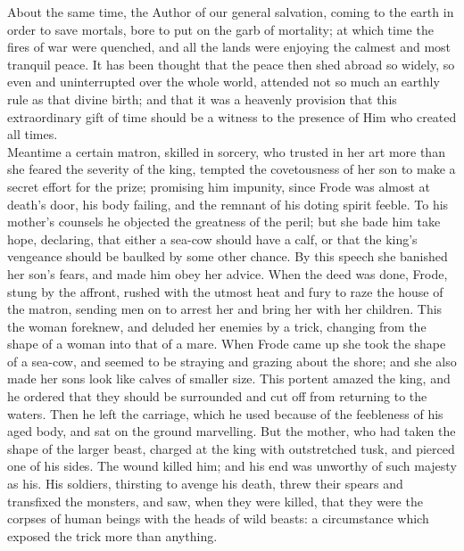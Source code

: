 \documentclass[10pt,a4paper]{report}
\begin{document}
About the same time, the Author of our general salvation, coming to the earth in order to save mortals, bore to put on the garb of mortality; at which time the fires of war were quenched, and all the lands were enjoying the calmest and most tranquil peace. It has been thought that the peace then shed abroad so widely, so even and uninterrupted over the whole world, attended not so much an earthly rule as that divine birth; and that it was a heavenly provision that this extraordinary gift of time should be a witness to the presence of Him who created all times.\\

Meantime a certain matron, skilled in sorcery, who trusted in her art more than she feared the severity of the king, tempted the covetousness of her son to make a secret effort for the prize; promising him impunity, since Frode was almost at death's door, his body failing, and the remnant of his doting spirit feeble. To his mother's counsels he objected the greatness of the peril; but she bade him take hope, declaring, that either a sea-cow should have a calf, or that the king's vengeance should be baulked by some other chance. By this speech she banished her son's fears, and made him obey her advice. When the deed was done, Frode, stung by the affront, rushed with the utmost heat and fury to raze the house of the matron, sending men on to arrest her and bring her with her children. This the woman foreknew, and deluded her enemies by a trick, changing from the shape of a woman into that of a mare. When Frode came up she took the shape of a sea-cow, and seemed to be straying and grazing about the shore; and she also made her sons look like calves of smaller size. This portent amazed the king, and he ordered that they should be surrounded and cut off from returning to the waters. Then he left the carriage, which he used because of the feebleness of his aged body, and sat on the ground marvelling. But the mother, who had taken the shape of the larger beast, charged at the king with outstretched tusk, and pierced one of his sides. The wound killed him; and his end was unworthy of such majesty as his. His soldiers, thirsting to avenge his death, threw their spears and transfixed the monsters, and saw, when they were killed, that they were the corpses of human beings with the heads of wild beasts: a circumstance which exposed the trick more than anything.\\
\end{document}
